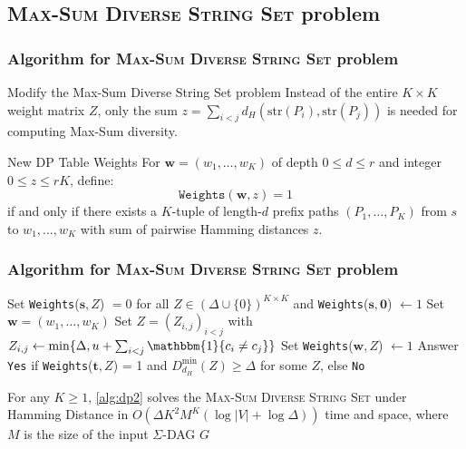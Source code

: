 \documentclass{beamer}
\begin{document}
\subsection{\textsc{Max-Sum Diverse String Set} problem}
\begin{frame}
    \frametitle{Algorithm for \textsc{Max-Sum Diverse String Set} problem}
    \begin{block}{Modify the Max-Sum Diverse String Set problem}
            Instead of the entire \( K \times K \) weight matrix \( Z \), only the sum \( z = \sum_{i<j} d_H(\text{str}(P_i), \text{str}(P_j)) \) is needed for computing Max-Sum diversity.
    \end{block}

    \begin{block}{New DP Table Weights}
        For \( \mathbf{w} = (w_1, \dots, w_K) \) of depth \( 0 \leq d  \leq r\) and integer \( 0 \leq z \leq rK \), define:
        \[
        \texttt{Weights}(\mathbf{w}, z) = 1
        \]
        if and only if there exists a \( K \)-tuple of length-\( d \) prefix paths \( (P_1, \dots, P_K) \) from \( s \) to \( w_1, \dots, w_K \) with sum of pairwise Hamming distances \( z \).
    \end{block}

\end{frame}

\begin{frame}
    \frametitle{Algorithm for \textsc{Max-Sum Diverse String Set} problem}
    \begin{algorithm}[H] \label{alg:dp2}
        \footnotesize{\caption{}}
        \footnotesize{\begin{algorithmic}[1]
            \State Set \texttt{Weights}($\mathbf{s}, Z$) $=0$ for all $Z \in (\Delta \cup \{0\})^{K \times K}$ and \texttt{Weights}($\mathbf{s}, \mathbf{0}$) $\gets 1$
                        \State Set $\mathbf{w} = (w_1, \dots, w_K)$
                            \State Set $Z = (Z_{i,j})_{i<j}$ with $Z_{i,j} \gets \min \{\Delta, u + \sum_{i<j}\mathbbm{1}\{c_i \neq c_j\}\}$
                            \State Set \texttt{Weights}($\mathbf{w}, Z$) $\gets 1$ 
                        \EndFor
                    \EndFor
                \EndFor
            \EndFor
            \State Answer \texttt{Yes} if \texttt{Weights}($\mathbf{t}, Z$) = 1 and $D_{d_H}^{\text{min}}(Z) \geq \Delta$ for some $Z$, else \texttt{No}
        \end{algorithmic}}
    \end{algorithm}
    \small{For any $K \geq 1$, \ref{alg:dp2} solves the \textsc{Max-Sum Diverse String Set} under Hamming Distance in $O(\Delta K^2 M^K (\log |V| + \log \Delta))$ time and space, where $M$ is the size of the input $\Sigma$-DAG $G$}
\end{frame}
\end{document}
